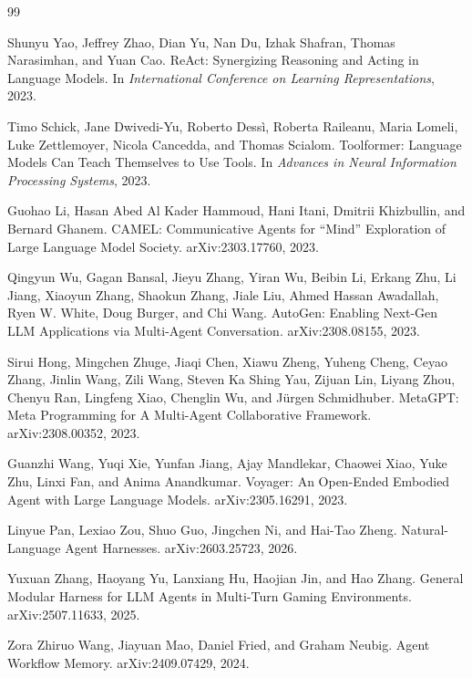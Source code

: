 \documentclass{article}
\begin{document}
\begin{thebibliography}{99}

Shunyu Yao, Jeffrey Zhao, Dian Yu, Nan Du, Izhak Shafran, Thomas Narasimhan, and Yuan Cao.
\newblock ReAct: Synergizing Reasoning and Acting in Language Models.
\newblock In \emph{International Conference on Learning Representations}, 2023.

Timo Schick, Jane Dwivedi-Yu, Roberto Dess\`i, Roberta Raileanu, Maria Lomeli, Luke Zettlemoyer, Nicola Cancedda, and Thomas Scialom.
\newblock Toolformer: Language Models Can Teach Themselves to Use Tools.
\newblock In \emph{Advances in Neural Information Processing Systems}, 2023.

Guohao Li, Hasan Abed Al Kader Hammoud, Hani Itani, Dmitrii Khizbullin, and Bernard Ghanem.
\newblock CAMEL: Communicative Agents for ``Mind'' Exploration of Large Language Model Society.
\newblock arXiv:2303.17760, 2023.

Qingyun Wu, Gagan Bansal, Jieyu Zhang, Yiran Wu, Beibin Li, Erkang Zhu, Li Jiang, Xiaoyun Zhang, Shaokun Zhang, Jiale Liu, Ahmed Hassan Awadallah, Ryen W. White, Doug Burger, and Chi Wang.
\newblock AutoGen: Enabling Next-Gen LLM Applications via Multi-Agent Conversation.
\newblock arXiv:2308.08155, 2023.

Sirui Hong, Mingchen Zhuge, Jiaqi Chen, Xiawu Zheng, Yuheng Cheng, Ceyao Zhang, Jinlin Wang, Zili Wang, Steven Ka Shing Yau, Zijuan Lin, Liyang Zhou, Chenyu Ran, Lingfeng Xiao, Chenglin Wu, and J\"urgen Schmidhuber.
\newblock MetaGPT: Meta Programming for A Multi-Agent Collaborative Framework.
\newblock arXiv:2308.00352, 2023.

Guanzhi Wang, Yuqi Xie, Yunfan Jiang, Ajay Mandlekar, Chaowei Xiao, Yuke Zhu, Linxi Fan, and Anima Anandkumar.
\newblock Voyager: An Open-Ended Embodied Agent with Large Language Models.
\newblock arXiv:2305.16291, 2023.

Linyue Pan, Lexiao Zou, Shuo Guo, Jingchen Ni, and Hai-Tao Zheng.
\newblock Natural-Language Agent Harnesses.
\newblock arXiv:2603.25723, 2026.

Yuxuan Zhang, Haoyang Yu, Lanxiang Hu, Haojian Jin, and Hao Zhang.
\newblock General Modular Harness for LLM Agents in Multi-Turn Gaming Environments.
\newblock arXiv:2507.11633, 2025.

Zora Zhiruo Wang, Jiayuan Mao, Daniel Fried, and Graham Neubig.
\newblock Agent Workflow Memory.
\newblock arXiv:2409.07429, 2024.


\end{thebibliography}
\end{document}

